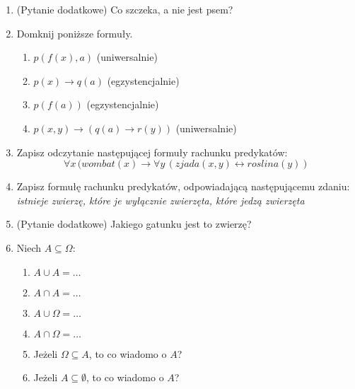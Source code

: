 \documentclass{mwart}
\renewcommand{\iff}{\ensuremath\leftrightarrow}
\renewcommand{\iff}{\leftrightarrow}
\begin{document}
\begin{enumerate}
\begin{multicols}{2}
\begin{enumerate}
	\end{enumerate}
	\end{multicols}
\item (Pytanie dodatkowe) Co szczeka, a nie jest psem?	
		\item Domknij poniższe formuły.
		\begin{multicols}{2}
			\begin{enumerate}
				\item $p(f(x), a)$ (uniwersalnie)
				\item $p(x) \to q(a)$ (egzystencjalnie)
				\item $p(f(a))$ (egzystencjalnie)
				\item $p(x,y)\to (q(a)\to r(y))$ (uniwersalnie)
			\end{enumerate}
		\end{multicols}
\item Zapisz odczytanie następującej formuły rachunku predykatów:
\[ \forall x\, (wombat(x) \to \forall y\,(zjada(x,y)\iff roslina(y)) \] 
\item Zapisz formułę rachunku predykatów, odpowiadającą następującemu zdaniu: \emph{istnieje zwierzę, które je wyłącznie zwierzęta, które jedzą zwierzęta}
\item (Pytanie dodatkowe) Jakiego gatunku jest to zwierzę?
\item Niech $A\subseteq \Omega$:
\begin{enumerate}
\item $A\cup A=\ldots$
\item $A\cap A=\ldots$
\item $A\cup \Omega=\ldots$
\item $A\cap \Omega=\ldots$
\item Jeżeli $\Omega\subseteq A$, to co wiadomo o $A$?
\item Jeżeli $A\subseteq \emptyset$, to co wiadomo o $A$?
\end{enumerate}
\end{enumerate}
\end{document}
